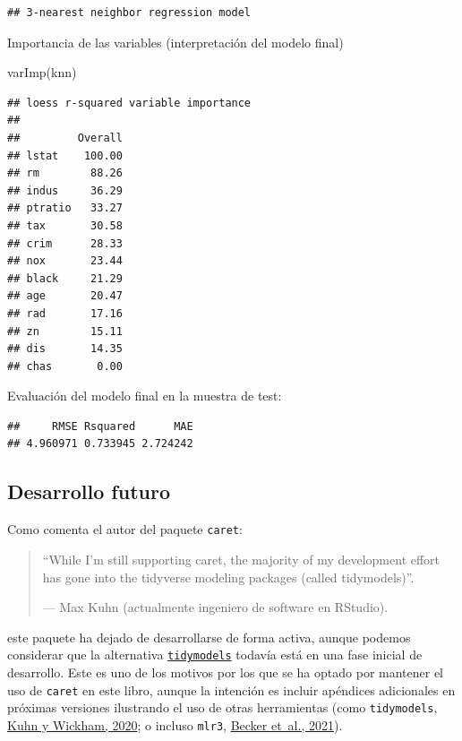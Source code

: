 \documentclass[
  spanish,
]{book}
\newenvironment{Shaded}{\begin{snugshade}}{\end{snugshade}}
\newcommand{\AttributeTok}[1]{\textcolor[rgb]{0.77,0.63,0.00}{#1}}
\newcommand{\FunctionTok}[1]{\textcolor[rgb]{0.00,0.00,0.00}{#1}}
\newcommand{\NormalTok}[1]{#1}
\newcommand{\SpecialCharTok}[1]{\textcolor[rgb]{0.00,0.00,0.00}{#1}}
\theoremstyle{break}
\theoremstyle{definition}
\theoremstyle{definition}
\theoremstyle{definition}
\theoremstyle{definition}
\theoremstyle{remark}
\begin{document}
\begin{verbatim}
## 3-nearest neighbor regression model
\end{verbatim}

Importancia de las variables (interpretación del modelo final)

\begin{Shaded}
\begin{Highlighting}[]
\FunctionTok{varImp}\NormalTok{(knn)}
\end{Highlighting}
\end{Shaded}

\begin{verbatim}
## loess r-squared variable importance
## 
##         Overall
## lstat    100.00
## rm        88.26
## indus     36.29
## ptratio   33.27
## tax       30.58
## crim      28.33
## nox       23.44
## black     21.29
## age       20.47
## rad       17.16
## zn        15.11
## dis       14.35
## chas       0.00
\end{verbatim}

Evaluación del modelo final en la muestra de test:

\begin{Shaded}
\end{Shaded}

\begin{verbatim}
##     RMSE Rsquared      MAE 
## 4.960971 0.733945 2.724242
\end{verbatim}

\hypertarget{desarrollo-futuro}{%
\subsection{Desarrollo futuro}\label{desarrollo-futuro}}

Como comenta el autor del paquete \texttt{caret}:

\begin{quote}
``While I'm still supporting caret, the majority of my development effort has gone into the tidyverse modeling packages (called tidymodels)''.

--- Max Kuhn (actualmente ingeniero de software en RStudio).
\end{quote}

este paquete ha dejado de desarrollarse de forma activa, aunque podemos considerar que la alternativa \href{https://www.tidymodels.org}{\texttt{tidymodels}} todavía está en una fase inicial de desarrollo.
Este es uno de los motivos por los que se ha optado por mantener el uso de \texttt{caret} en este libro, aunque la intención es incluir apéndices adicionales en próximas versiones ilustrando el uso de otras herramientas (como \texttt{tidymodels}, \protect\hyperlink{ref-kuhn2020tidymodels}{Kuhn y Wickham, 2020}; o incluso \texttt{mlr3}, \protect\hyperlink{ref-becker2021mlr3}{Becker et~al., 2021}).
\end{document}

